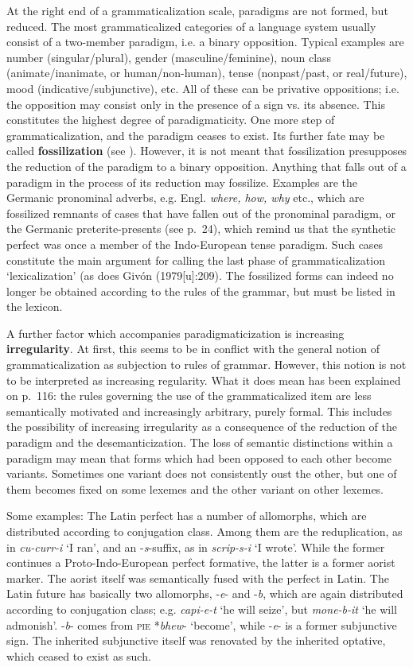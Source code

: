 At the right end of a grammaticalization scale, paradigms are not formed, but reduced. The most grammaticalized categories of a language system usually consist of a two-member paradigm, i.e. a binary opposition. Typical examples are number (singular/plural), gender (masculine/feminine), noun class (animate/inanimate, or human/non-human), tense (nonpast/past, or real/future), mood (indicative/subjunctive), etc. All of these can be privative oppositions; i.e. the opposition may consist only in the presence of a sign vs. its absence. This constitutes the highest degree of paradigmaticity. One more step of grammaticalization, and the paradigm ceases to exist. Its further fate may be called \textbf{fossilization} (see \citet[35f]{HeineEtAl1984} ). However, it is not meant that fossilization presupposes the reduction of the paradigm to a binary opposition. Anything that falls out of a paradigm in the process of its reduction may fossilize. Examples are the Germanic pronominal adverbs, e.g. Engl. \textit{where, how, why} etc., which are fossilized remnants of cases that have fallen out of the pronominal paradigm, or the Germanic preterite-presents (see p.~24), which remind us that the synthetic perfect was once a member of the Indo-European tense paradigm. Such cases constitute the main argument for calling the last phase of grammaticalization ‘lexicalization’ (as does Givón (1979[u]:209). The fossilized forms can indeed no longer be obtained according to the rules of the grammar, but must be listed in the lexicon.

A further factor which accompanies paradigmaticization is increasing \textbf{irregularity}. At first, this seems to be in conflict with the general notion of grammaticalization as subjection to rules of grammar. However, this notion is not to be interpreted as increasing regularity. What it does mean has been explained on p.~116: the rules governing the use of the grammaticalized item are less semantically motivated and increasingly arbitrary, purely formal. This includes the possibility of increasing irregularity as a consequence of the reduction of the paradigm and the desemanticization. The loss of semantic distinctions within a paradigm may mean that forms which had been opposed to each other become variants. Sometimes one variant does not consistently oust the other, but one of them becomes fixed on some lexemes and the other variant on other lexemes.

Some examples: The Latin perfect has a number of allomorphs, which are distributed according to conjugation class. Among them are the reduplication, as in \textit{cu-curr-i} ‘I ran’, and an -\textit{s}{}-suffix, as in \textit{scrip-s-i} ‘I wrote’. While the former continues a Proto-Indo-European perfect formative, the latter is a former aorist marker. The aorist itself was semantically fused with the perfect in Latin. The Latin future has basically two allomorphs, -\textit{e}{}- and -\textit{b}, which are again distributed according to conjugation class; e.g. \textit{capi-e-t} ‘he will seize’, but \textit{mone-b-it} ‘he will admonish’. -\textit{b}{}- comes from \textsc{pie} *\textit{bhew}{}- ‘become’, while -\textit{e}{}- is a former subjunctive sign. The inherited subjunctive itself was renovated by the inherited optative, which ceased to exist as such.

